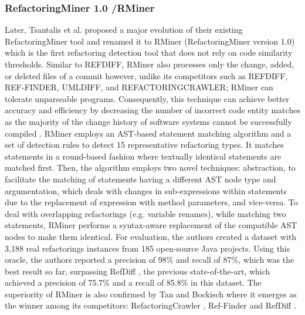 \documentclass[letterpaper,12pt,onecolumn,final]{report}
\begin{document}
\subsubsection{RefactoringMiner 1.0 /RMiner}
Later, Tsantalis et al. \cite{Tsantalis2018} proposed a major evolution of their existing RefactoringMiner \cite{Silva2016} \cite{Tsantalis2013} tool and renamed it to RMiner (RefactoringMiner version 1.0) which is the first refactoring detection tool that does not rely on code similarity thresholds. Similar to REFDIFF, RMiner also processes only the change, added, or deleted files of a commit however, unlike its competitors such as REFDIFF, REF-FINDER, UMLDIFF, and REFACTORINGCRAWLER; RMiner can tolerate unparseable programs. Consequently, this technique can achieve better accuracy and efficiency by decreasing the number of incorrect code entity matches as the majority of the change history of software systems cannot be successfully compiled \cite{Tufano2017}. RMiner employs an AST-based statement matching algorithm and a set of detection rules to detect 15 representative refactoring types. It matches statements in a round-based fashion where textually identical statements are matched first. Then, the algorithm employs two novel techniques: abstraction, to facilitate the matching of statements having a different AST node type and argumentation, which deals with changes in sub-expressions within statements due to the replacement of expression with method parameters, and vice-versa. To deal with overlapping refactorings (e.g. variable renames), while matching two statements, RMiner performs a syntax-aware replacement of the compatible AST nodes to make them identical. For evaluation, the authors created a dataset with 3,188 real refactorings instances from 185 open-source Java projects. Using this oracle, the authors reported a precision of 98\% and recall of 87\%, which was the best result so far, surpassing RefDiff \cite{Silva2017}, the previous state-of-the-art, which achieved a precision of 75.7\% and a recall of 85.8\% in this dataset. The superiority of RMiner is also confirmed by Tan and Bockisch \cite{Tan2019} where it emerges as the winner among its competitors: RefactoringCrawler \cite{Dig2006}, Ref-Finder \cite{Prete2010} and RefDiff \cite{Silva2017}.
\end{document}
